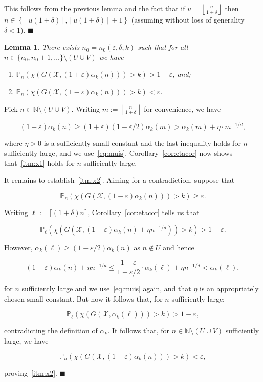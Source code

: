 \documentclass[11pt]{article}%
\newenvironment{proof}{\vspace{1ex}\noindent{\bf Proof.}}{\hspace*{\fill}$\blacksquare$\vspace{1ex}}
\newtheorem{lemma}[lemma]{Lemma}
\newcommand{\Xcal}[0]{\ensuremath{{\mathcal X}}}
\newcommand{\eN}[0]{\ensuremath{ \mathbb N}}
\newcommand{\Pee}[0]{\ensuremath{{\mathbb P}}}
\newcommand{\eps}{\varepsilon}
\begin{document}
\begin{proof}
This follows from the previous lemma and the fact that if $u = \left\lfloor\frac{n}{1+\delta}\right\rfloor$ then 
$n \in \left\{ \left\lceil u(1+\delta)\right\rceil, \left\lceil u(1+\delta)\right\rceil + 1 \right\}$
(assuming without loss of generality $\delta<1$).
\end{proof}

\begin{lemma}\label{lem:elf}
There exists $n_0 = n_0(\eps,\delta,k)$ such that for all $n \in \{n_0,n_0+1,\dots\} \setminus (U\cup V)$ we have 
\begin{enumerate}
\item\label{itm:x1} $\Pee_n\left( \chi( G(\Xcal,(1+\eps)\alpha_k(n)))  > k \right) > 1-\eps$, and;
\item\label{itm:x2} $\Pee_n\left( \chi( G(\Xcal,(1-\eps)\alpha_k(n))) > k \right) < \eps$.
\end{enumerate}
\end{lemma}

\begin{proof}
 Pick $n \in \eN \setminus (U\cup V)$.
 Writing $m := \left\lfloor\frac{n}{1+\delta}\right\rfloor$ for convenience, we have 
 
$$ (1+\eps)\alpha_k(n) \geq 
(1+\eps)(1-\eps/2)\alpha_k\left(m\right) >  \alpha_k\left(m\right) + \eta\cdot m^{-1/d},     
$$
 
\noindent
where $\eta>0$ is a sufficiently small constant and the last inequality holds for $n$ sufficiently large, 
and we use~\eqref{eq:muis}.
Corollary~\ref{cor:etacor} now shows that~\ref{itm:x1} holds for $n$ sufficiently large.

It remains to establish~\ref{itm:x2}.
Aiming for a contradiction, suppose that

$$ \Pee_n( \chi(G(\Xcal, (1-\eps)\alpha_k(n))) > k ) \geq \eps. $$

Writing $\ell := \lceil(1+\delta)n\rceil$, Corollary~\ref{cor:etacor} tells us that 

$$ \Pee_\ell( \chi(G(\Xcal, (1-\eps)\alpha_k(n)+\eta n^{-1/d})) > k ) > 1-\eps. $$

However, $\alpha_k(\ell) \geq (1-\eps/2)\alpha_k(n)$ as $n \not\in U$ and hence

$$ (1-\eps)\alpha_k(n)+\eta n^{-1/d} \leq \frac{1-\eps}{1-\eps/2} \cdot \alpha_k(\ell) +\eta n^{-1/d}
< \alpha_k(\ell), $$

\noindent
for $n$ sufficiently large and we use~\eqref{eq:muis} again, and that $\eta$ is an appropriately chosen small constant.
But now it follows that, for $n$ sufficiently large: 

$$ \Pee_\ell( \chi(G(\Xcal, \alpha_k(\ell))) > k ) > 1-\eps, $$ 

\noindent
contradicting the definition of $\alpha_k$.
It follows that, for $n \in \eN \setminus (U\cup V)$ sufficiently large, we have 

$$ \Pee_n( \chi(G(\Xcal, (1-\eps)\alpha_k(n))) > k ) < \eps, $$

\noindent 
proving~\ref{itm:x2}.
\end{proof}
\end{document}
